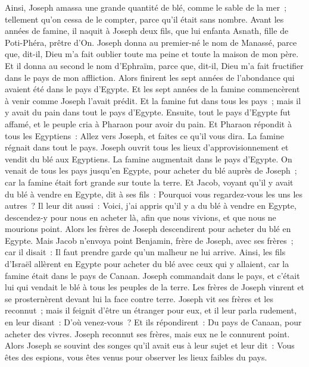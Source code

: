 \begin{multicols}{2}
Ainsi, Joseph amassa une grande quantité de blé, comme le sable de la mer~; tellement qu'on cessa de le compter, parce qu'il était sans nombre.
Avant les années de famine, il naquit à Joseph deux fils, que lui enfanta Asnath, fille de Poti-Phéra, prêtre d'On.
Joseph donna au premier-né le nom de Manassé, parce que, dit-il, Dieu m'a fait oublier toute ma peine et toute la maison de mon père.
Et il donna au second le nom d'Ephraïm, parce que, dit-il, Dieu m'a fait fructifier dans le pays de mon affliction.
Alors finirent les sept années de l'abondance qui avaient été dans le pays d'Egypte.
Et les sept années de la famine commencèrent à venir comme Joseph l'avait prédit. Et la famine fut dans tous les pays~; mais il y avait du pain dans tout le pays d'Egypte.
Ensuite, tout le pays d'Egypte fut affamé, et le peuple cria à Pharaon pour avoir du pain. Et Pharaon répondit à tous les Egyptiens~: Allez vers Joseph, et faites ce qu'il vous dira.
La famine régnait dans tout le pays. Joseph ouvrit tous les lieux d'approvisionnement et vendit du blé aux Egyptiens. La famine augmentait dans le pays d'Egypte.
On venait de tous les pays jusqu'en Egypte, pour acheter du blé auprès de Joseph~; car la famine était fort grande sur toute la terre.
\VerseOne{}Et Jacob, voyant qu'il y avait du blé à vendre en Egypte, dit à ses fils~: Pourquoi vous regardez-vous les uns les autres~?
Il leur dit aussi~: Voici, j'ai appris qu'il y a du blé à vendre en Egypte, descendez-y pour nous en acheter là, afin que nous vivions, et que nous ne mourions point.
Alors les frères de Joseph descendirent pour acheter du blé en Egypte.
Mais Jacob n'envoya point Benjamin, frère de Joseph, avec ses frères~; car il disait~: Il faut prendre garde qu'un malheur ne lui arrive.
Ainsi, les fils d'Israël allèrent en Egypte pour acheter du blé avec ceux qui y allaient, car la famine était dans le pays de Canaan.
Joseph commandait dans le pays, et c'était lui qui vendait le blé à tous les peuples de la terre. Les frères de Joseph vinrent et se prosternèrent devant lui la face contre terre.
Joseph vit ses frères et les reconnut~; mais il feignit d'être un étranger pour eux, et il leur parla rudement, en leur disant~: D'où venez-vous~? Et ils répondirent~: Du pays de Canaan, pour acheter des vivres.
Joseph reconnut ses frères, mais eux ne le connurent point.
Alors Joseph se souvint des songes qu'il avait eus à leur sujet et leur dit~: Vous êtes des espions, vous êtes venus pour observer les lieux faibles du pays.

\end{multicols}

